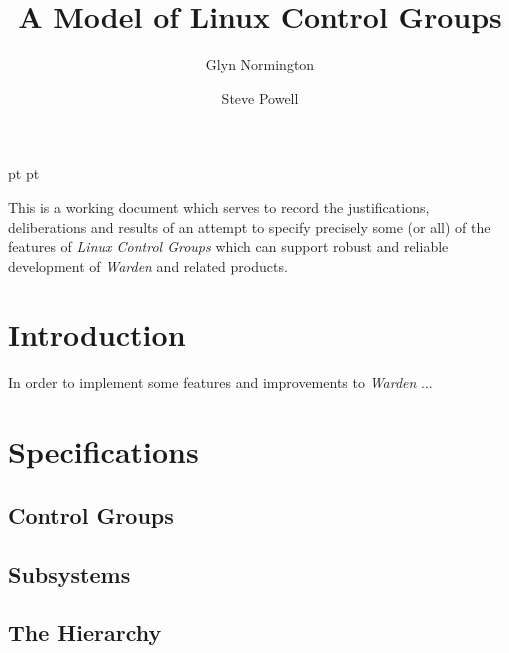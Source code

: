 \documentclass[a4paper,twoside,12pt]{article}
\begin{document}
 pt
 pt

\title{A Model of Linux Control Groups}
\author{
Glyn Normington\and
Steve Powell
}
\maketitle
\thispagestyle{myheadings}
\setcounter{page}{1}

This is a working document which serves to record the justifications, deliberations and results of an attempt to
specify precisely some (or all) of the features of \emph{Linux Control Groups} which can support robust and reliable development of \emph{Warden} and related products.


\newcommand{\true}{true}
\newcommand{\false}{false}
\renewcommand{\emptyset}{\varnothing}

\clearpage
\tableofcontents

\clearpage
{}

\section{Introduction}

In order to implement some features and improvements to \emph{Warden} ...

\section{Specifications}

\subsection{Control Groups}

\subsection{Subsystems}

\subsection{The Hierarchy}
\end{document}
